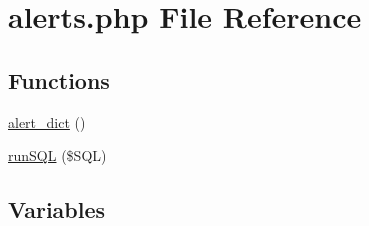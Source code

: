 \hypertarget{alerts_8php}{}\section{alerts.\+php File Reference}
\label{alerts_8php}
\subsection*{Functions}
\begin{DoxyCompactItemize}
\item 
\hyperlink{alerts_8php_a39cc6d68da40b461170d87a183c6d08e}{alert\+\_\+dict} ()
\item 
\hyperlink{alerts_8php_a508906286211b4a6c5c393195505b870}{run\+S\+QL} (\$S\+QL)
\end{DoxyCompactItemize}
\subsection*{Variables}
